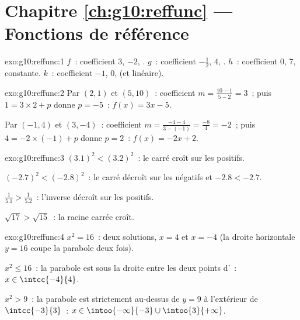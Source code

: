 \section*{Chapitre \ref{ch:g10:reffunc} --- Fonctions de référence}

\begin{solution}{exo:g10:reffunc:1}
$f$~: coefficient $3$,  $-2$, . \quad
$g$~: coefficient $-\frac12$,  $4$, .
\quad $h$~: coefficient $0$,  $7$, constante.
\quad $k$~: coefficient $-1$,  $0$, 
(et linéaire).
\end{solution}

\begin{solution}{exo:g10:reffunc:2}
Par $(2,1)$ et $(5,10)$~: coefficient $m = \frac{10 - 1}{5 - 2} = 3$~;
puis $1 = 3 \times 2 + p$ donne $p = -5$~: $f(x) = 3x - 5$.

Par $(-1,4)$ et $(3,-4)$~: coefficient
$m = \frac{-4 - 4}{3 - (-1)} = \frac{-8}{4} = -2$~; puis
$4 = -2 \times (-1) + p$ donne $p = 2$~: $f(x) = -2x + 2$.
\end{solution}

\begin{solution}{exo:g10:reffunc:3}
$(3.1)^2 < (3.2)^2$~: le carré croît sur les positifs.

$(-2.7)^2 < (-2.8)^2$~: le carré décroît sur les négatifs et
$-2.8 < -2.7$.

$\frac{1}{5.1} > \frac{1}{5.2}$~: l'inverse décroît sur les positifs.

$\sqrt{17} > \sqrt{15}$~: la racine carrée croît.
\end{solution}

\begin{solution}{exo:g10:reffunc:4}
$x^2 = 16$~: deux solutions, $x = 4$ et $x = -4$ (la droite horizontale
$y = 16$ coupe la parabole deux fois).

$x^2 \leq 16$~: la parabole est sous la droite entre les deux points
d'~: $x \in \intcc{-4}{4}$.

$x^2 > 9$~: la parabole est strictement au-dessus de $y = 9$ à
l'extérieur de $\intcc{-3}{3}$~:
$x \in \intoo{-\infty}{-3} \cup \intoo{3}{+\infty}$.
\end{solution}

